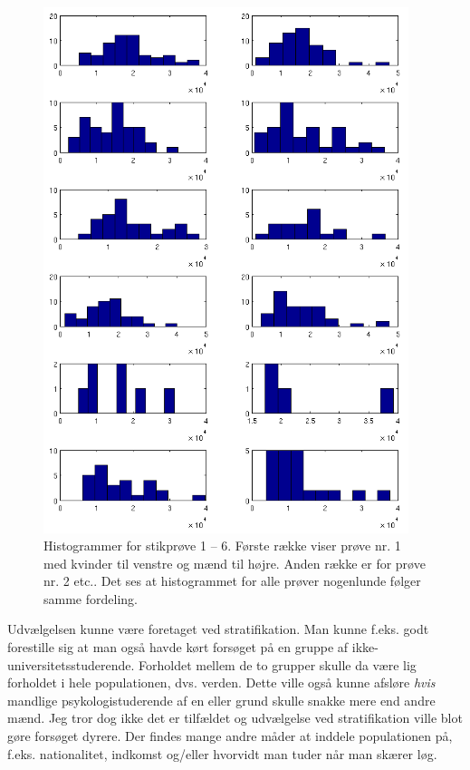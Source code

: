 \documentclass[a4paper, 10pt, danish, final]{article}
\begin{document}
\begin{figure}[h]
    \centering
    \includegraphics[width=0.95\textwidth]{images/dists_iid}
    \caption{Histogrammer for stikprøve 1 -- 6. Første række viser prøve
    nr. 1 med kvinder til venstre og mænd til højre. Anden række er for
    prøve nr. 2 etc.. Det ses at histogrammet for alle prøver nogenlunde
    følger samme fordeling.}
    \label{dists_iid}
\end{figure}

Udvælgelsen kunne være foretaget ved stratifikation. Man kunne f.eks.
godt forestille sig at man også havde kørt forsøget på en gruppe af
ikke-universitetsstuderende. Forholdet mellem de to grupper skulle da
være lig forholdet i hele populationen, dvs. verden. Dette ville også
kunne afsløre \emph{hvis} mandlige psykologistuderende af en eller grund
skulle snakke mere end andre mænd. Jeg tror dog ikke det er tilfældet og
udvælgelse ved stratifikation ville blot gøre forsøget dyrere. Der
findes mange andre måder at inddele populationen på, f.eks.
nationalitet, indkomst og/eller hvorvidt man tuder når man skærer løg.
\end{document}
